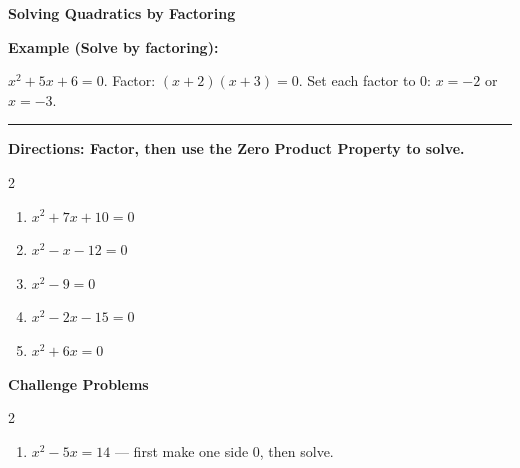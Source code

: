 \documentclass[12pt]{article}
\begin{document}
\vspace{0.35cm}

\begin{center}{\Large \textbf{Solving Quadratics by Factoring}}\end{center}\vspace{0.25cm}
\textbf{Example (Solve by factoring):}

$x^{2}+5x+6=0$. Factor: $(x+2)(x+3)=0$. Set each factor to $0$: $x=-2$ or $x=-3$.

\vspace{0.3cm}\hrule\vspace{0.4cm}
\textbf{Directions: Factor, then use the Zero Product Property to solve.}

\begin{multicols}{2}
\begin{enumerate}[label=\textbf{\arabic*.}, start=1, itemsep=3cm]
  \item $\displaystyle x^{2}+7x+10=0$
  \item $\displaystyle x^{2}-x-12=0$
  \item $\displaystyle x^{2}-9=0$
  \item $\displaystyle x^{2}-2x-15=0$
  \item $\displaystyle x^{2}+6x=0$
\end{enumerate}
\end{multicols}
\newpage

\begin{center}{\large \textbf{Challenge Problems}}\end{center}\vspace{0.3cm}
\begin{multicols}{2}\begin{enumerate}[label=\textbf{\arabic*.}, start=6, itemsep=2.6cm]
  \item $x^{2}-5x=14$ — first make one side $0$, then solve.
\end{enumerate}\end{multicols}\newpage
\end{document}
